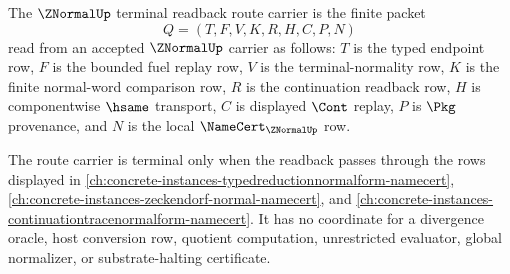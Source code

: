 \begin{definition}
\label{def:znormal-terminal-readback-route-carrier}
The $\ZNormalUp$ terminal readback route carrier is the finite packet
$$
Q=(T,F,V,K,R,H,C,P,N)
$$
read from an accepted $\ZNormalUp$ carrier as follows: $T$ is the typed endpoint row, $F$ is the bounded fuel replay row, $V$ is the terminal-normality row, $K$ is the finite normal-word comparison row, $R$ is the continuation readback row, $H$ is componentwise $\hsame$ transport, $C$ is displayed $\Cont$ replay, $P$ is $\Pkg$ provenance, and $N$ is the local $\NameCert_{\ZNormalUp}$ row.

The route carrier is terminal only when the readback passes through the rows displayed in \autoref{ch:concrete-instances-typedreductionnormalform-namecert}, \autoref{ch:concrete-instances-zeckendorf-normal-namecert}, and \autoref{ch:concrete-instances-continuationtracenormalform-namecert}. It has no coordinate for a divergence oracle, host conversion row, quotient computation, unrestricted evaluator, global normalizer, or substrate-halting certificate.
\end{definition}


